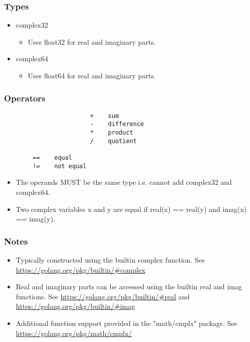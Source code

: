 \documentclass{article}
\begin{document}
			\subsubsection{Types}
			\begin{itemize}
    				\item complex32
					\begin{itemize}
						\item Uses float32 for real and imaginary parts.
					\end{itemize}
    				\item complex64
					\begin{itemize}
						\item Uses float64 for real and imaginary parts.
					\end{itemize}
			\end{itemize}
			\subsubsection{Operators}
				\begin{verbatim}
					    +    sum  
					    -    difference   
					    *    product       
					    /    quotient     
					    
	    ==    equal
	    !=    not equal
				\end{verbatim}	
				\begin{itemize}
					\item The operands MUST be the same type i.e. cannot add complex32 and complex64.
					\item Two complex variables x and y are equal if real(x) == real(y) and imag(x) == imag(y).
				\end{itemize}
			\subsubsection{Notes}
				\begin{itemize}
					\item Typically constructed using the builtin \colorbox{code}{complex} function. See \url{https://golang.org/pkg/builtin/#complex}
					\item Real and imaginary parts can be accessed using the builtin \colorbox{code}{real} and \colorbox{code}{imag} functions. See \url{https://golang.org/pkg/builtin/#real} and \url{https://golang.org/pkg/builtin/#imag}
					\item Additional function support provided in the "math/cmplx" package. See \url{https://golang.org/pkg/math/cmplx/}
				\end{itemize}
			
\end{document}
